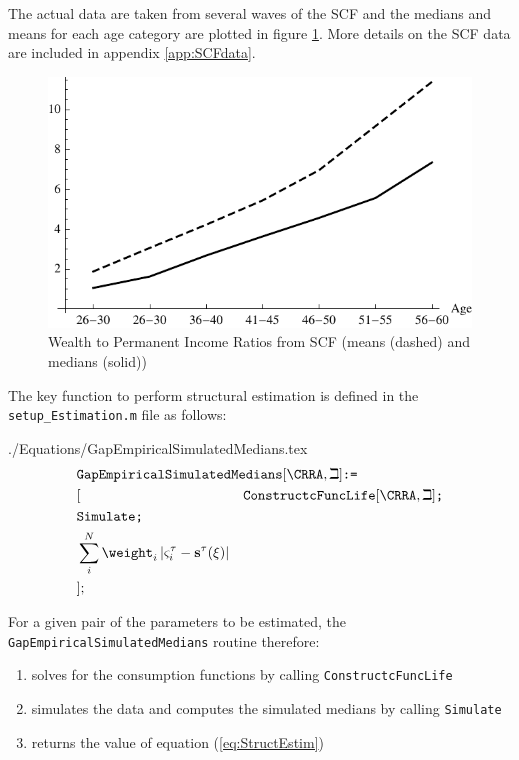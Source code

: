 \documentclass[titlepage, headings=optiontotocandhead]{\econtex}
\begin{document}
The actual data are taken from several waves of the SCF and the medians and means for each age category are plotted in figure \ref{fig:MeanMedianSCF}. More details on the SCF data are included in appendix \ref{app:SCFdata}.
\hypertarget{PlotMeanMedianSCFcollegeGrads}{}
\begin{figure}
  \includegraphics{./Figures/PlotMeanMedianSCFcollegeGrads}
  \caption{Wealth to Permanent Income Ratios from SCF (means (dashed) and medians (solid))}
  \label{fig:MeanMedianSCF}
\end{figure}

The key function to perform structural estimation is defined in the \texttt{setup\_Estimation.m} file as follows:
\begin{verbatimwrite}{./Equations/GapEmpiricalSimulatedMedians.tex}
  \begin{equation}\begin{gathered}\begin{aligned}
        \lefteqn{    \texttt{GapEmpiricalSimulatedMedians$[\CRRA,\beth]$:=}}    \nonumber \\
        &[&\texttt{ConstructcFuncLife$[\CRRA,\beth]$;}\nonumber\\
        &\texttt{Simulate;}\nonumber\\
        &\sum\limits_{i}^{N}\weight _{i}\left|\varsigma_{i}^{\tau }-\mathbf{s}^{\tau}(\xi )\right| \nonumber\\
        &];&\nonumber
      \end{aligned}\end{gathered}\end{equation}
\end{verbatimwrite}
\unskip
For a given pair of the parameters to be estimated, the \texttt{GapEmpiricalSimulatedMedians} routine therefore:
\begin{enumerate}
\item solves for the consumption functions by calling \texttt{ConstructcFuncLife}
\item simulates the data and computes the simulated medians by calling \texttt{Simulate}
\item returns the value of equation (\ref{eq:StructEstim})
\end{enumerate}
\end{document}
